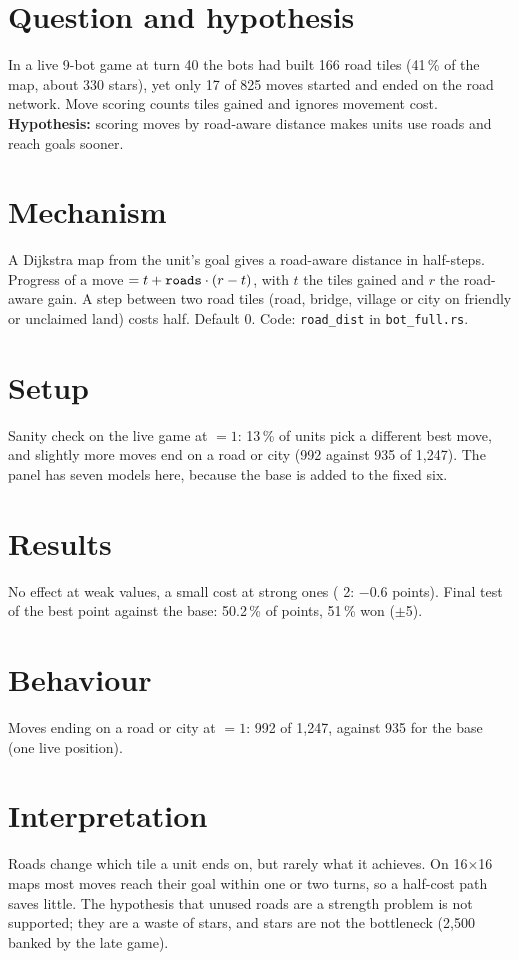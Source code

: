 \documentclass{../polyexp}
\begin{document}

\ExpHeader

\section{Question and hypothesis}
In a live 9-bot game at turn 40 the bots had built 166 road tiles (41\,\% of the map, about 330 stars), yet only 17 of 825 moves started and ended on the road network. Move scoring counts tiles gained and ignores movement cost. \textbf{Hypothesis:} scoring moves by road-aware distance makes units use roads and reach goals sooner.

\section{Mechanism}
A Dijkstra map from the unit's goal gives a road-aware distance in half-steps. Progress of a move $= t + \texttt{roads}\cdot(r - t)$, with $t$ the tiles gained and $r$ the road-aware gain. A step between two road tiles (road, bridge, village or city on friendly or unclaimed land) costs half. Default 0. Code: \texttt{road\_dist} in \texttt{bot\_full.rs}.

\section{Setup}
Sanity check on the live game at  $=1$: 13\,\% of units pick a different best move, and slightly more moves end on a road or city (992 against 935 of 1,247). The panel has seven models here, because the base is added to the fixed six.

\section{Results}
\ExpResults

No effect at weak values, a small cost at strong ones ( 2: $-0.6$ points). Final test of the best point against the base: 50.2\,\% of points, 51\,\% won ($\pm$5).

\section{Behaviour}
Moves ending on a road or city at  $=1$: 992 of 1,247, against 935 for the base (one live position).

\section{Interpretation}
Roads change which tile a unit ends on, but rarely what it achieves. On 16$\times$16 maps most moves reach their goal within one or two turns, so a half-cost path saves little. The hypothesis that unused roads are a strength problem is not supported; they are a waste of stars, and stars are not the bottleneck (2,500 banked by the late game).
\end{document}
